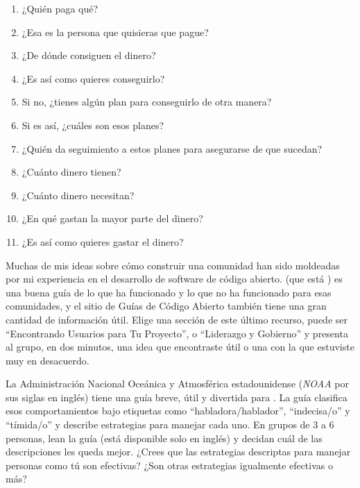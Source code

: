 \begin{enumerate}

\item
  ¿Quién paga qué?

\item
  ¿Esa es la persona que quisieras que pague? 
  
\item
  ¿De dónde consiguen el dinero?

\item
  ¿Es así como quieres conseguirlo?

\item
  Si no, ¿tienes algún plan para conseguirlo de otra manera?

\item
  Si es así, ¿cuáles son esos planes?

\item
  ¿Quién da seguimiento a estos planes para asegurarse de que sucedan?

\item
  ¿Cuánto dinero tienen?

\item
  ¿Cuánto dinero necesitan?

\item
  ¿En qué gastan la mayor parte del dinero?

\item
  ¿Es así como quieres gastar el dinero?

\end{enumerate}


Muchas de mis ideas sobre cómo construir una comunidad
han sido moldeadas por mi experiencia en el desarrollo de software de código abierto.
\cite{Foge2005} (que está )
es una buena guía de lo que ha funcionado y lo que no ha funcionado para esas comunidades,
y el  {sitio de Guías de Código Abierto}
también tiene una gran cantidad de información útil.
Elige una sección de este último recurso, puede ser  ``Encontrando Usuarios para Tu Proyecto'',
o ``Liderazgo y Gobierno''
y presenta al grupo, en dos minutos, una idea
que encontraste útil o una con la que estuviste muy en desacuerdo.


La Administración Nacional Oceánica y Atmosférica estadounidense (\emph{NOAA} por sus siglas en inglés) tiene una guía breve, útil y divertida para
.
La guía clasifica esos comportamientos bajo etiquetas como ``habladora/hablador'', ``indecisa/o'' y ``tímida/o''
y describe estrategias para manejar cada uno.
En grupos de 3 a 6 personas,
lean la guía (está disponible solo en inglés) y decidan cuál de las descripciones les queda mejor.
¿Crees que las estrategias descriptas para manejar personas como tú son efectivas?
¿Son otras estrategias igualmente efectivas o más?

